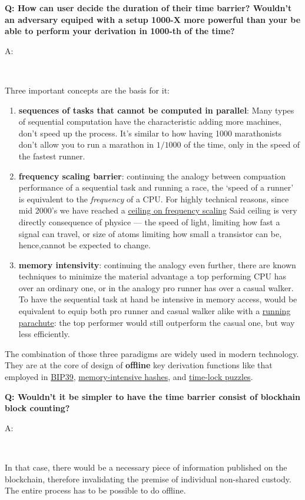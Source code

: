 \documentclass[12pt,a4paper]{article}
\newenvironment{question}[1]{%
  \vspace{0.8em}\noindent\textbf{Q: #1}\par
  \vspace{0.2em}\noindent\begin{itshape}A:\end{itshape}~%
}{\vspace{0.8em}}
\newcommand{\mhh}{https://security.stackexchange.com/questions/237498/how-does-memory-hard-hashing-passwords-protect-against-brute-force-attacks\#237511}
\newcommand{\bipref}{https://github.com/bitcoin/bips/blob/master/bip-0039.mediawiki}
\newcommand{\tlp}{https://en.wikipedia.org/wiki/Time-lock_puzzle}
\begin{document}
\begin{question}{How can user decide the duration of their time barrier? Wouldn't an adversary equiped with a setup 1000-X more powerful than your be able to perform your derivation in 1000-th of the time?}
Three important concepts are the basis for it:
\begin{enumerate}
 \item \textbf{sequences of tasks that cannot be computed in parallel}: Many types of sequential computation have the characteristic adding more machines, don't speed up the process. It's similar to how having 1000 marathonists don't allow you to run a marathon in $1/1000$ of the time, only in the speed of the fastest runner.
 \item \textbf{frequency scaling barrier}: continuing the analogy between compuation performance of a sequential task and running a race, the `speed of a runner' is equivalent to the \textit{frequency} of a CPU. For highly technical reasons, since mid 2000's we have reached a \href{https://en.wikipedia.org/wiki/Frequency_scaling}{ceiling on frequency scaling} Said ceiling is very directly consequence of physice --- the speed of light, limiting how fast a signal can travel, or size of atoms limiting how small a transistor can be, hence,cannot be expected to change.
 \item \textbf{memory intensivity}: continuing the analogy even further, there are known techniques to minimize the material advantage a top performing CPU has over an ordinary one, or in the analogy pro runner has over a casual walker. To have the sequential task at hand be intensive in memory access, would be equivalent to equip both pro runner and casual walker alike with a \href{https://duckduckgo.com/?q=running+parachute&iar=images&t=brave}{running parachute}: the top performer would still outperform the casual one, but way less efficiently.
\end{enumerate}
The combination of those three paradigms are widely used in modern technology. They are at the core of design of \textbf{offline} key derivation functions like that employed in \href{\bipref}{BIP39}, \href{\mhh}{memory-intensive hashes}, and \href{\tlp}{time-lock puzzles}.
\end{question}

\begin{question}{Wouldn't it be simpler to have the time barrier consist of blockhain block counting?}
In that case, there would be a necessary piece of information published on the blockchain, therefore invalidating the premise of individual non-shared custody. The entire process has to be possible to do offline.
\end{question}
\end{document}
